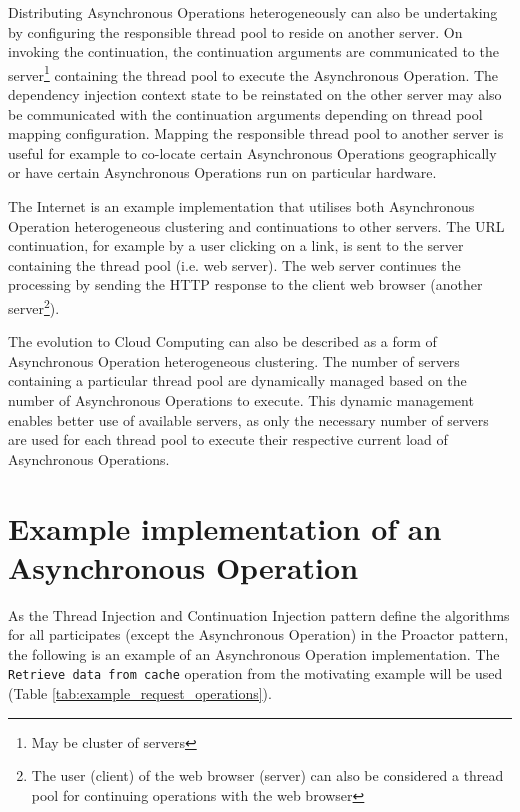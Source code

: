 \documentclass[prodmode]{style/acmlarge}
\begin{document}
Distributing Asynchronous Operations heterogeneously can also be undertaking by
configuring the responsible thread pool to reside on another server.  On
invoking the continuation, the continuation arguments are communicated to the
server\footnote{May be cluster of servers} containing the thread pool to execute
the Asynchronous Operation.  The dependency injection context state to be
reinstated on the other server may also be communicated with the continuation
arguments depending on thread pool mapping configuration.  Mapping the
responsible thread pool to another server is useful for example to co-locate
certain Asynchronous Operations geographically or have certain Asynchronous
Operations run on particular hardware.

The Internet is an example implementation that utilises both Asynchronous
Operation heterogeneous clustering and continuations to other servers.  The URL
continuation, for example by a user clicking on a link, is sent to the server
containing the thread pool (i.e. web server).  The web server continues the
processing by sending the HTTP response to the client web browser (another
server\footnote{The user (client) of the web browser (server) can also be
considered a thread pool for continuing operations with the web browser}).

The evolution to Cloud Computing can also be described as a form of Asynchronous
Operation heterogeneous clustering.  The number of servers containing a
particular thread pool are dynamically managed based on the number of
Asynchronous Operations to execute.  This dynamic management enables better use
of available servers, as only the necessary number of servers are used for each
thread pool to execute their respective current load of Asynchronous Operations.


\section{Example implementation of an Asynchronous Operation}

As the Thread Injection and Continuation Injection pattern define the algorithms
for all participates (except the Asynchronous Operation) in the Proactor
pattern, the following is an example of an Asynchronous Operation
implementation.  The \texttt{Retrieve data from cache} operation from the
motivating example will be used (Table \ref{tab:example_request_operations}).
\end{document}
